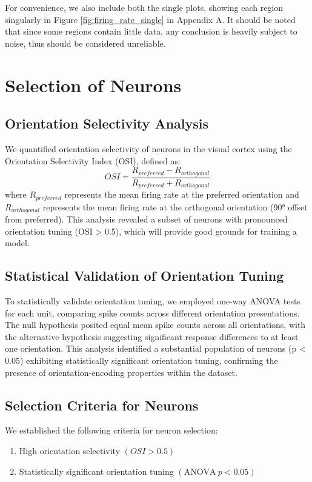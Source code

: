 \documentclass[10pt,twocolumn]{article}
\begin{document}
For convenience, we also include both the single plots, showing each region singularly in Figure \ref{fig:firing_rate_single} in Appendix A. It should be noted that since some regions contain little data, any conclusion is heavily subject to noise, thus should be considered unreliable.

\section{Selection of Neurons}

\subsection{Orientation Selectivity Analysis}
We quantified orientation selectivity of neurons in the visual cortex using the Orientation Selectivity Index (OSI), defined as:
\begin{equation}
OSI = \frac{R_{preferred} - R_{orthogonal}}{R_{preferred} + R_{orthogonal}}
\end{equation}
where $R_{preferred}$ represents the mean firing rate at the preferred orientation and $R_{orthogonal}$ represents the mean firing rate at the orthogonal orientation (90° offset from preferred). This analysis revealed a subset of neurons with pronounced orientation tuning (OSI > 0.5), which will provide good grounds for training a model.

\subsection{Statistical Validation of Orientation Tuning}
To statistically validate orientation tuning, we employed one-way ANOVA tests for each unit, comparing spike counts across different orientation presentations. The null hypothesis posited equal mean spike counts across all orientations, with the alternative hypothesis suggesting significant response differences to at least one orientation. This analysis identified a substantial population of neurons (p < 0.05) exhibiting statistically significant orientation tuning, confirming the presence of orientation-encoding properties within the dataset.

\subsection{Selection Criteria for Neurons}
We established the following criteria for neuron selection:
\begin{enumerate}
    \item High orientation selectivity $(OSI > 0.5)$
    \item Statistically significant orientation tuning $(\mathrm{ANOVA} \ p < 0.05)$
\end{enumerate}
\end{document}
